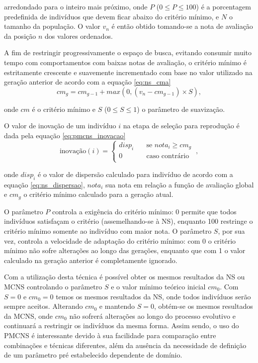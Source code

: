 \noindent arredondado para o inteiro mais próximo, onde $P$ ($0 \leq P \leq 100$) é a porcentagem predefinida  de indivíduos que devem ficar abaixo do critério mínimo, e $N$ o tamanho da população. O valor $v_n$ é então obtido tomando-se a nota de avaliação da posição $n$ dos valores ordenados.

A fim de restringir progressivamente o espaço de busca, evitando consumir muito tempo com comportamentos com baixas notas de avaliação, o critério mínimo é estritamente crescente e suavemente incrementado com base no valor utilizado na geração anterior de acordo com a equação \ref{eq:ns_cma}
\begin{equation}
    {cm}_g = {cm}_{g-1} + {max}(0,(v_n-{cm}_{g-1}) \times S),
    \label{eq:ns_cma}
\end{equation}

\noindent onde ${cm}$ é o critério mínimo e $S$ ($0 \leq S \leq 1$) o parâmetro de suavização.

O valor de inovação de um indivíduo $i$ na etapa de seleção para reprodução é dada pela equação \ref{eq:pmcns_inovacao}
\begin{equation}
    \text{inovação}(i) = 
        \begin{cases}
            {disp}_i & \quad \text{se } {nota}_i \geq {cm}_g \\ 
            0 & \quad \text{caso contrário}\\
       \end{cases}~,
    \label{eq:pmcns_inovacao}
\end{equation}

\noindent onde ${disp}_i$ é o valor de dispersão calculado para indivíduo de acordo com a equação \ref{eq:ns_dispersao}, ${nota}_i$ sua nota em relação a função de avaliação global e ${cm}_g$ o critério mínimo calculado para a geração atual.

O parâmetro $P$ controla a exigência do critério mínimo: 0 permite que todos indivíduos satisfaçam o critério (assemelhando-se à NS), enquanto 100 restringe o critério mínimo somente ao indivíduo com maior nota. O parâmetro $S$, por sua vez, controla a velocidade de adaptação do critério mínimo: com 0 o critério mínimo não sofre alterações ao longo das gerações, enquanto que com 1 o valor calculado na geração anterior é completamente ignorado.

Com a utilização desta técnica é possível obter os mesmos resultados da NS ou MCNS controlando o parâmetro  $S$ e o valor mínimo teórico inicial ${cm}_0$. Com $S=0$ e ${cm}_0=0$ temos os mesmos resultados da NS, onde todos indivíduos serão sempre aceitos. Alterando ${cm}_0$ e mantendo  $S=0$, obtém-se os mesmos resultados da MCNS, onde ${cm}_0$ não sofrerá alterações ao longo do processo evolutivo e continuará a restringir os indivíduos da mesma forma. Assim sendo, o uso do PMCNS é interessante devido à sua facilidade para comparação entre combinações e técnicas diferentes, além da ausência da necessidade de definição de um parâmetro pré estabelecido dependente de domínio.

